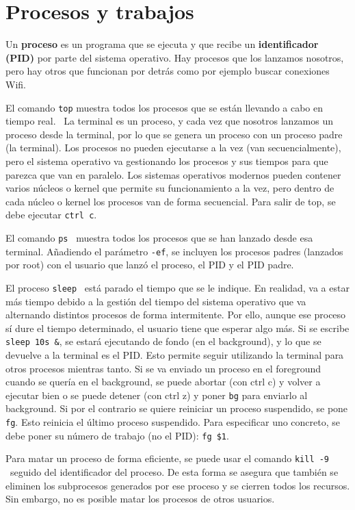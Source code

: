 \documentclass{config/apuntes}
\begin{document}
\section{Procesos y trabajos}
Un \textbf{proceso} es un programa que se ejecuta y que recibe un \textbf{identificador (PID)} por parte del sistema operativo. Hay procesos que los lanzamos nosotros, pero hay otros que funcionan por detrás como por ejemplo buscar conexiones Wifi. 

El comando \texttt{top} muestra todos los procesos que se están llevando a cabo en tiempo real.  \ La terminal es un proceso, y cada vez que nosotros lanzamos un proceso desde la terminal, por lo que se genera un proceso con un proceso padre (la terminal). Los procesos no pueden ejecutarse a la vez (van secuencialmente), pero el sistema operativo va gestionando los procesos y sus tiempos para que parezca que van en paralelo. Los sistemas operativos modernos pueden contener varios núcleos o kernel que permite su funcionamiento a la vez, pero dentro de cada núcleo o kernel los procesos van de forma secuencial. Para salir de top, se debe ejecutar \texttt{ctrl c}.

El comando \texttt{ps} \marginpar[\footnotesize ps] \ muestra todos los procesos que se han lanzado desde esa terminal. Añadiendo el parámetro \texttt{-ef}, se incluyen los procesos padres (lanzados por root) con el usuario que lanzó el proceso, el PID y el PID padre.

El proceso \texttt{sleep}  \ está parado el tiempo que se le indique. En realidad, va a estar más tiempo debido a la gestión del tiempo del sistema operativo que va alternando distintos procesos de forma intermitente. Por ello, aunque ese proceso sí dure el tiempo determinado, el usuario tiene que esperar algo más. Si se escribe \texttt{sleep 10s \&}, se estará ejecutando de fondo (en el background), y lo que se devuelve a la terminal es el PID. Esto permite seguir utilizando la terminal para otros procesos mientras tanto. Si se va enviado un proceso en el foreground cuando se quería en el background, se puede abortar (con ctrl c) y volver a ejecutar bien o se puede detener (con ctrl z) y poner \texttt{bg} para enviarlo al background. Si por el contrario se quiere reiniciar un proceso suspendido, se pone \texttt{fg}. Esto reinicia el último proceso suspendido. Para especificar uno concreto, se debe poner su número de trabajo (no el PID): \texttt{fg \$1}. 

Para matar un proceso de forma eficiente, se puede usar el comando \texttt{kill -9}  \ seguido del identificador del proceso. De esta forma se asegura que también se eliminen los subprocesos generados por ese proceso y se cierren todos los recursos. Sin embargo, no es posible matar los procesos de otros usuarios.
\end{document}

